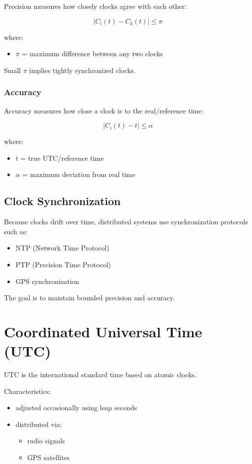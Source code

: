 Precision measures how closely clocks agree with each other:

\[
|C_i(t)-C_k(t)| \le \pi
\]

where:

\begin{itemize}
    \item \(\pi\) = maximum difference between any two clocks
\end{itemize}

Small \(\pi\) implies tightly synchronized clocks.

\subsubsection{Accuracy}

Accuracy measures how close a clock is to the real/reference time:

\[
|C_i(t)-t| \le \alpha
\]

where:

\begin{itemize}
    \item \(t\) = true UTC/reference time
    \item \(\alpha\) = maximum deviation from real time
\end{itemize}

\subsection{Clock Synchronization}

Because clocks drift over time, distributed systems use synchronization
protocols such as:

\begin{itemize}
    \item NTP (Network Time Protocol)
    \item PTP (Precision Time Protocol)
    \item GPS synchronization
\end{itemize}

The goal is to maintain bounded precision and accuracy.

\section{Coordinated Universal Time (UTC)}

UTC is the international standard time based on atomic clocks.

Characteristics:

\begin{itemize}
    \item adjusted occasionally using leap seconds
    \item distributed via:
    \begin{itemize}
        \item radio signals
        \item GPS satellites
    \end{itemize}
\end{itemize}

